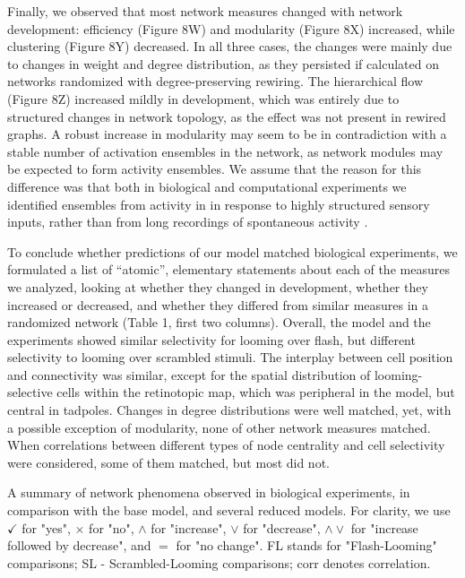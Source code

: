 \documentclass{article}
\begin{document}
Finally, we observed that most network measures changed with network development: efficiency (Figure 8W) and modularity (Figure 8X) increased, while clustering (Figure 8Y) decreased. In all three cases, the changes were mainly due to changes in weight and degree distribution, as they persisted if calculated on networks randomized with degree-preserving rewiring. The hierarchical flow (Figure 8Z) increased mildly in development, which was entirely due to structured changes in network topology, as the effect was not present in rewired graphs. A robust increase in modularity may seem to be in contradiction with a stable number of activation ensembles in the network, as network modules may be expected to form activity ensembles. We assume that the reason for this difference was that both in biological and computational experiments we identified ensembles from activity in in response to highly structured sensory inputs, rather than from long recordings of spontaneous activity \citep{triplett2018emergence}.

To conclude whether predictions of our model matched biological experiments, we formulated a list of “atomic”, elementary statements about each of the measures we analyzed, looking at whether they changed in development, whether they increased or decreased, and whether they differed from similar measures in a randomized network (Table 1, first two columns). Overall, the model and the experiments showed similar selectivity for looming over flash, but different selectivity to looming over scrambled stimuli. The interplay between cell position and connectivity was similar, except for the spatial distribution of looming-selective cells within the retinotopic map, which was peripheral in the model, but central in tadpoles. Changes in degree distributions were well matched, yet, with a possible exception of modularity, none of other network measures matched. When correlations between different types of node centrality and cell selectivity were considered, some of them matched, but most did not.

\begin{table}
    
    \caption{A summary of network phenomena observed in biological experiments, in comparison with the base model, and several reduced models. For clarity, we use $\checkmark$ for "yes", $\times$ for "no", $\land$ for "increase", $\lor$ for "decrease", $\land \lor$ for "increase followed by decrease", and $=$ for "no change". FL stands for "Flash-Looming" comparisons; SL - Scrambled-Looming comparisons; corr denotes correlation.}
\end{table}
\end{document}
